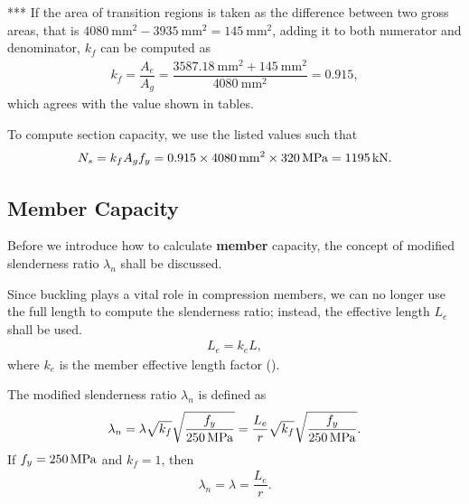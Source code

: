 \begin{solution}
*** If the area of transition regions is taken as the difference between two gross areas, that is $\SI{4080}{\mm^2}-\SI{3935}{\mm^2}=\SI{145}{\mm^2}$, adding it to both numerator and denominator, $k_f$ can be computed as
\begin{gather*}
k_f=\dfrac{A_e}{A_g}=\dfrac{\SI{3587.18}{\mm^2}+\SI{145}{\mm^2}}{\SI{4080}{\mm^2}}=0.915,
\end{gather*}
which agrees with the value shown in tables.

To compute section capacity, we use the listed values such that
\begin{gather*}
N_s=k_fA_gf_y=0.915\times\SI{4080}{\milli\meter^2}\times\SI{320}{\mega\pascal}=\SI{1195}{\kilo\newton}.
\end{gather*}
\end{solution}
\subsection{Member Capacity}\label{sec:n_c}
Before we introduce how to calculate \textbf{member} capacity, the concept of modified slenderness ratio $\lambda_n$ shall be discussed.

Since buckling plays a vital role in compression members, we can no longer use the full length to compute the slenderness ratio; instead, the effective length $L_e$ shall be used.
\begin{gather}
L_e=k_eL,
\end{gather}
where $k_e$ is the member effective length factor ().

The modified slenderness ratio $\lambda_n$ is defined as
\begin{gather}
\lambda_n=\lambda\sqrt{k_f}\sqrt{\dfrac{f_y}{\SI{250}{\mega\pascal}}}=\dfrac{L_e}{r}\sqrt{k_f}\sqrt{\dfrac{f_y}{\SI{250}{\mega\pascal}}}.
\end{gather}
If $f_y=\SI{250}{\mega\pascal}$ and $k_f=1$, then
\begin{gather*}
\lambda_n=\lambda=\dfrac{L_e}{r}.
\end{gather*}

